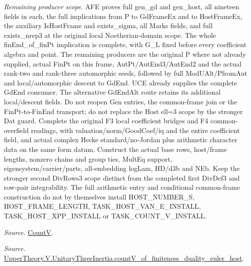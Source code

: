 \emph{Remaining producer scope.} AFE proves full gen\_\allowbreak gd and gen\_\allowbreak host, all nineteen fields in each, the full implications from P to GdFrameEx and to HostFrameEx, the auxiliary IsHostFrame and exists\_\allowbreak sigma, all Marks fields, and full exists\_\allowbreak nrep3 at the original local Noetherian-domain scope. The whole finEnd\_\allowbreak of\_\allowbreak finPt implication is complete, with G\_\allowbreak L fixed before every coefficient algebra and point. The remaining producers are the original P where not already supplied, actual FinPt on this frame, AutPt/AutEnd3/AutEnd2 and the actual rank-two and rank-three automorphic seeds, followed by full ModUAlt/PfromAut and local/automorphic descent to GdEnd. UCE already supplies the complete GdEnd consumer. The alternative GdEndAlt route retains its additional local/descent fields. Do not reopen Gen entries, the common-frame join or the FinPt-to-FinEnd transport; do not replace the Host ell=3 scope by the stronger Dat guard. Complete the original F3 local coefficient bridges and F4 common-overfield readings, with valuation/norm/GoodCoef/iq and the entire coefficient field, and actual complex Hecke standard/no-Jordan plus arithmetic character data on the same form datum. Construct the actual base rows, host/frame lengths, nonzero chains and group ties, MultEq support, eigensystem/carrier/parts, all-embedding logLam, HD/d3b and NEb. Keep the stronger second DivRows3 scope distinct from the completed first DivDef3 and row-pair integrability. The full arithmetic entry and conditional common-frame construction do not by themselves install HOST\_\allowbreak NUMBER\_\allowbreak S, HOST\_\allowbreak FRAME\_\allowbreak LENGTH, TASK\_\allowbreak HOST\_\allowbreak VAN\_\allowbreak E\_\allowbreak INSTALL, TASK\_\allowbreak HOST\_\allowbreak XPP\_\allowbreak INSTALL or TASK\_\allowbreak COUNT\_\allowbreak V\_\allowbreak INSTALL.

\emph{Source.} \href{https://github.com/CocoSgt/riemann-hypothesis-lean/blob/7cbf7a0c32fca1badf05931879a37c3f8a2b03b4/src/Development/AutomorphicArithmetic/AutomorphicVarieties/HeightAndVanishing/Counts.lean#L69-L69}{CountV}.

\emph{Source.} \href{https://github.com/CocoSgt/riemann-hypothesis-lean/blob/7cbf7a0c32fca1badf05931879a37c3f8a2b03b4/src/Development/AutomorphicArithmetic/AutomorphicVarieties/ModularityArgument/ThresholdArguments/DenseThresholdCases/CountVOf.lean#L33-L60}{UpperTheory.V.UnitaryThreeInertia.countV\_\allowbreak of\_\allowbreak finiteness\_\allowbreak duality\_\allowbreak euler\_\allowbreak host}.



